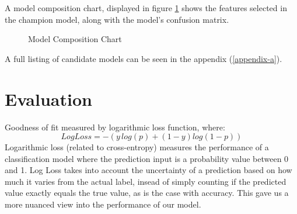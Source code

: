 \vskip 1cm

A model composition chart, displayed in figure \ref{fig:model5features} shows the features selected in the champion model, along with the model's confusion matrix.

\begin{figure}[!hb]
    \caption{\label{fig:model5features} Model Composition Chart}
\end{figure}
\cite{cm}

A full listing of candidate models can be seen in the appendix (\ref{appendix-a}).

\section{Evaluation}
\vskip 1cm
Goodness of fit measured by logarithmic loss function, where: $$ Log Loss = -(y\,log(p) + (1 - y)log(1 - p)) $$
\vskip 1cm
\indent Logarithmic loss (related to cross-entropy) measures the performance of a classification model where the prediction input is a probability value between 0 and 1. Log Loss takes into account the uncertainty of a prediction based on how much it varies from the actual label, insead of simply counting if the predicted value exactly equals the true value, as is the case with accuracy. This gave us a more nuanced view into the performance of our model.